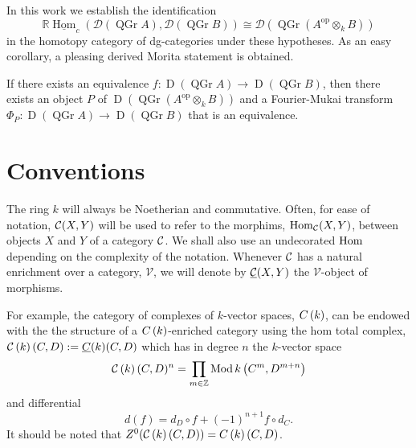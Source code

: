 In this work we establish the identification
\[\mathbb{R}\underline{\operatorname{Hom}}_c(\mathcal{D}(\operatorname{QGr} A), \mathcal{D}(\operatorname{QGr} B)) \cong \mathcal{D}(\operatorname{QGr}(A^{\operatorname{op}} \otimes_k B))\]
in the homotopy category of dg-categories under these hypotheses.
As an easy corollary, a pleasing derived Morita statement is obtained.
\begin{theorem}
  If there exists an equivalence
  \(f \colon \operatorname{D}(\operatorname{QGr} A) \to \operatorname{D}(\operatorname{QGr} B)\),
  then there exists an object \(P\) of \(\operatorname{D}\left(\operatorname{QGr} \left(A^{\operatorname{op}} \otimes_k B\right)\right)\) and a Fourier-Mukai transform
  \(\Phi_P \colon \operatorname{D}(\operatorname{QGr} A) \to \operatorname{D}(\operatorname{QGr} B)\)
  that is an equivalence.
\end{theorem}

\section*{Conventions}
The ring \(k\) will always be Noetherian and commutative.
Often, for ease of notation, \(\mathcal{C}(X,Y)\) will be used to refer to the morphims, \(\operatorname{Hom}_{\mathcal{C}}(X,Y)\), between objects \(X\) and \(Y\) of a category \(\mathcal{C}\). We shall also use an undecorated \(\operatorname{Hom}\) depending on the complexity of the notation. 
Whenever \(\mathcal{C}\) has a natural enrichment over a category, \(\mathcal{V}\), we will denote by \(\underline{\mathcal{C}}(X,Y)\) the \(\mathcal{V}\)-object of morphisms.

For example, the category of complexes of \(k\)-vector spaces, \(C\left(k\right)\), can be endowed with the the structure of a \(C\left(k\right)\)-enriched category using the hom total complex, \(\mathcal{C}\left(k\right)(C,D) := \underline{C}(k)(C,D)\) which has in degree \(n\) the \(k\)-vector space
\[\mathcal{C}\left(k\right)(C,D)^n = \prod_{m \in \mathbb{Z}}\operatorname{Mod}k\left(C^m, D^{m + n}\right)\]
and differential
\[d(f) = d_D \circ f + (-1)^{n+1} f \circ d_C.\]
It should be noted that \(Z^0(\mathcal{C}\left(k\right)(C,D)) = C\left(k\right)(C,D)\).
